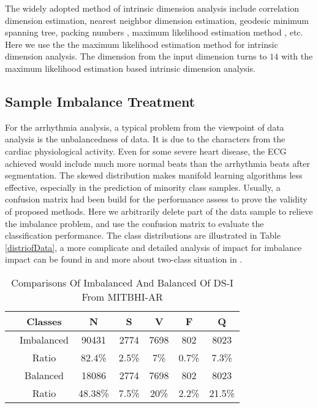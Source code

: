 \documentclass[journal]{IEEEtran}
\begin{document}
The widely adopted method of intrinsic dimension analysis include correlation dimension estimation, nearest neighbor dimension estimation\cite{costa2005estimating}, geodesic minimum spanning tree\cite{costa2004geodesic}, packing numbers \cite{kegl2003intrinsic}, maximum likelihood estimation method \cite{levina2005maximum}, etc.
Here we use the the maximum likelihood estimation method for intrinsic dimension analysis.
The dimension from the input dimension turns to $14$ with the maximum likelihood estimation based intrinsic dimension analysis.



%
%
\subsection{Sample Imbalance Treatment}
For the arrhythmia analysis, a typical problem from the viewpoint of data analysis is the unbalancedness of data.
It is due to the characters from the cardiac physiological activity.
Even for some severe heart disease, the ECG achieved would include much more normal beats than the arrhythmia beats after segmentation.
The skewed distribution makes manifold learning algorithms less effective, especially in the prediction of minority class samples.
Usually, a confusion matrix had been build for the performance assess to prove the validity of proposed methods.
Here we arbitrarily delete part of the data sample to relieve the imbalance problem, and use the confusion matrix to evaluate the classification performance. 
The class distributions are illustrated in Table \ref{distriofData}, a more complicate and detailed analysis of impact for imbalance impact can be found in \cite{wang2012multiclass} and more about two-class situation in \cite{he2009learning}.



\begin{table}[!htbp]
\begin{center}
\begin{threeparttable}
\caption{Comparisons Of Imbalanced And Balanced Of DS-I From MITBHI-AR}
\label{table1}
\begin{tabular}{ccccccc}
\hline
& Classes & N & S & V & F & Q \\
\hline
& Imbalanced  &90431  & 2774  & 7698 & 802  &8023\\
& Ratio & 82.4\%&  2.5\%& 7\% &  0.7\% & 7.3\% \\
\hline
& Balanced  & 18086 & 2774  & 7698 & 802 & 8023         \\
& Ratio & 48.38\%&  7.5\%& 20\% &  2.2\% & 21.5\% \\
\hline
\end{tabular}
\end{threeparttable}
\end{center}
\end{table}
     
\end{document}
